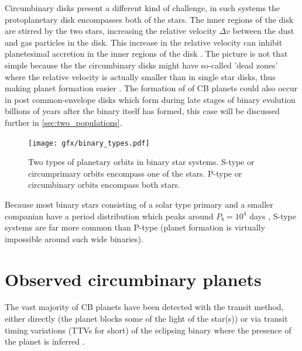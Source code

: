 \documentclass[ twoside,openright,titlepage,numbers=noenddot,headinclude,%
                footinclude=true,cleardoublepage=empty,abstractoff, %
                BCOR=5mm,paper=a4,fontsize=11pt,%
                american,%
                ]{scrreprt}
\begin{document}
 
 Circumbinary
 disks present a different kind of challenge, in such systems the protoplanetary
 disk encompasses both of the stars. The inner regions of the disk are 
 stirred by the two stars, increasing the relative velocity $\Delta v$ between
 the dust and gas particles in the disk. This increase in the relative velocity
 can inhibit planetesimal accretion in the inner regions of the disk
 \citep{meschiari2012}. The picture is not that simple because the the 
 circumbinary disks might have so-called 'dead zones' where the relative
 velocity is actually smaller than in single star disks, thus making planet
 formation easier \citep{rafikov2013, martin2013}. 
The formation of of CB planets could also occur in post 
 common-envelope disks which form during late stages of binary evolution 
 billions of years after the binary itself has formed, this case will be 
 discussed further in \cref{sec:two_populations}.
\begin{figure}[htb]
\centering
\texttt{[image: gfx/binary\_types.pdf]}
\caption{Two types of planetary orbits in binary star systems. S-type or
    circumprimary orbits encompass one of the stars. P-type or circumbinary
    orbits encompass both stars.}
\label{fig:binary_types}
\end{figure}

Because most binary stars consisting of a solar 
 type primary and a smaller
companian have a period distribution which peaks around $P_b=10^4$ days 
\citep{mayor1991}, S-type systems are far more common than P-type (planet 
formation is virtually impossible around such wide binaries).

\section{Observed circumbinary planets}
\label{sec:Observed circumbinary planets}
The vast majority of CB planets have been detected with
the transit method, either directly (the planet blocks some of the 
light of the star(s)) or via transit timing variations (TTVs for short)
of the eclipsing binary 
where the presence of the planet is inferred 
\citep[see][for explaination of exoplanet detection methods]{perryman}.
\end{document}
